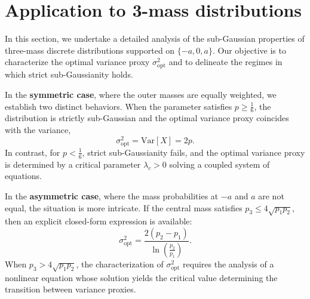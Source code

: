 \documentclass[a4paper, 10pt]{article}
\theoremstyle{definition}
\begin{document}

\section{Application to 3-mass distributions}\label{sec:3-mass}

In this section, we undertake a detailed analysis of the sub-Gaussian properties of three-mass discrete distributions supported on $\{-a,0,a\}$. Our objective is to characterize the optimal variance proxy $\sigma^2_{\mathrm{opt}}$ and to delineate the regimes in which strict sub-Gaussianity holds.  

In the \textbf{symmetric case}, where the outer masses are equally weighted, we establish two distinct behaviors. When the parameter satisfies $p \geq \tfrac{1}{6}$, the distribution is strictly sub-Gaussian and the optimal variance proxy coincides with the variance,
\[
\sigma^2_{\mathrm{opt}} = \mathrm{Var}[X] = 2p.
\]
In contrast, for $p < \tfrac{1}{6}$, strict sub-Gaussianity fails, and the optimal variance proxy is determined by a critical parameter $\lambda_c > 0$ solving a coupled system of equations.  

In the \textbf{asymmetric case}, where the mass probabilities at $-a$ and $a$ are not equal, the situation is more intricate. If the central mass satisfies $p_3 \leq 4\sqrt{p_1p_2}$, then an explicit closed-form expression is available:
\[
\sigma^2_{\mathrm{opt}} = \frac{2(p_2 - p_1)}{\ln\!\left(\tfrac{p_2}{p_1}\right)}.
\]
When $p_3 > 4\sqrt{p_1p_2}$, the characterization of $\sigma^2_{\mathrm{opt}}$ requires the analysis of a nonlinear equation whose solution yields the critical value determining the transition between variance proxies.  
 
\end{document}
